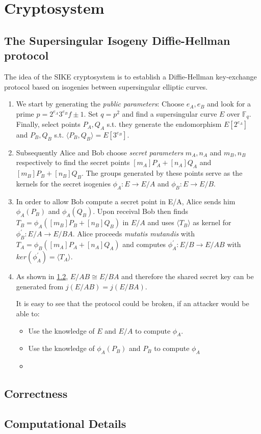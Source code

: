 \section{Cryptosystem}
\subsection{The Supersingular Isogeny Diffie-Hellman protocol}

The idea of the SIKE cryptosystem is to establish a Diffie-Hellman key-exchange protocol based on isogenies between supersingular elliptic curves. 



\begin{enumerate}[(1)]
	\item We start by generating the \textit{public parameters}: Choose $e_A,e_B$ and look for a prime $p=2^{e_A}3^{e_B}f\pm1$. Set $q=p^2$ and find a supersingular curve $E$ over $\mathbb{F}_q$. Finally, select points $P_A,Q_A$ s.t. they generate the endomorphism $E[2^{e_A}]$ and $P_B,Q_B$ s.t. $\langle P_B,Q_B\rangle=E[3^{e_B}]$. %
	\item Subsequently Alice and Bob choose \textit{secret parameters} $m_A,n_A$ and $m_B,n_B$ respectively to find the secret points $[m_A]P_A + [n_A]Q_A$ and $[m_B]P_B + [n_B]Q_B$. The groups generated by these points serve as the kernels for the secret isogenies $\phi_A : E \to E/A$ and $\phi_B : E \to E/B$.
	\item In order to allow Bob compute a secret point in E/A, Alice sends him $\phi_A(P_B)$ and $\phi_A(Q_B)$. Upon receival Bob then finds $T_B = \phi_A([m_B]P_B + [n_B]Q_B)$ in $E/A$ and uses $\langle T_B \rangle$ as kernel for $\phi^{\prime}_B : E/A \to E/BA$. Alice proceeds \textit{mutatis mutandis} with $T_A = \phi_B([m_A]P_A + [n_A]Q_A)$ and computes $\phi^{\prime}_A : E/B \to E/AB$ with $ker(\phi^{\prime}_A)= \langle T_A \rangle$.
	\item As shown in \ref{ch:correctness}, $E/AB \cong E/BA$ and therefore the shared secret key can be generated from $j(E/AB)=j(E/BA)$.
	
	It is easy to see that the protocol could be broken, if an attacker would be able to:
	
	\begin{itemize}[\textbullet]
		\item Use the knowledge of $E$ and $E/A$ to compute $\phi_A$.
		\item Use the knowledge of $\phi_A(P_B)$ and $P_B$ to compute $\phi_A$
		\item
	\end{itemize}
	
	
\end{enumerate} 


\subsection{Correctness}
\label{ch:correctness}


\subsection{Computational Details}
